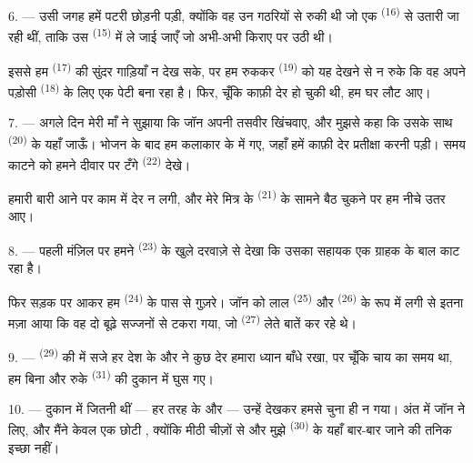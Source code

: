 6. --- उसी जगह हमें पटरी छोड़नी पड़ी, क्योंकि वह उन गठरियों से रुकी थी जो एक
 \textsuperscript{(16)} से उतारी जा रही थीं, ताकि उस
 \textsuperscript{(15)} में ले जाई जाएँ जो अभी-अभी किराए पर उठी थी।

इससे हम  \textsuperscript{(17)} की सुंदर गाड़ियाँ न देख
सके, पर हम रुककर  \textsuperscript{(19)} को यह देखने से न रुके
कि वह अपने पड़ोसी  \textsuperscript{(18)} के
लिए एक पेटी बना रहा है। फिर, चूँकि काफ़ी देर हो चुकी थी, हम घर लौट आए।

\VUsaut{3.0mm}

7. --- अगले दिन मेरी माँ ने सुझाया कि जॉन अपनी तसवीर खिंचवाए, और मुझसे कहा कि
उसके साथ  \textsuperscript{(20)} के यहाँ जाऊँ। भोजन के बाद हम
कलाकार के  में गए, जहाँ हमें काफ़ी देर प्रतीक्षा करनी पड़ी। समय
काटने को हमने दीवार पर टँगे  \textsuperscript{(22)} देखे।

हमारी बारी आने पर काम में देर न लगी, और मेरे मित्र के 
\textsuperscript{(21)} के सामने बैठ चुकने पर हम नीचे उतर आए।

8. --- पहली मंज़िल पर हमने  \textsuperscript{(23)} के खुले
दरवाज़े से देखा कि उसका सहायक एक ग्राहक के बाल काट रहा है।

फिर सड़क पर आकर हम  \textsuperscript{(24)} के पास से
गुज़रे। जॉन को लाल  \textsuperscript{(25)} और 
\textsuperscript{(26)} के रूप में लगी  से इतना मज़ा आया कि वह दो
बूढ़े सज्जनों से टकरा गया, जो  \textsuperscript{(27)} लेते
बातें कर रहे थे।

\VUsaut{3.0mm}

9. ---  \textsuperscript{(29)} की  में सजे हर देश
के  और  ने कुछ देर हमारा ध्यान बाँधे रखा, पर चूँकि
चाय का समय था, हम बिना और रुके  \textsuperscript{(31)} की दुकान में
घुस गए।

10. --- दुकान में जितनी  थीं — हर तरह के  और  — उन्हें देखकर हमसे चुना ही न गया। अंत
में जॉन ने  लिए, और मैंने केवल एक छोटी ,
क्योंकि मीठी चीज़ों से  और मुझे 
\textsuperscript{(30)} के यहाँ बार-बार जाने की तनिक इच्छा नहीं।


